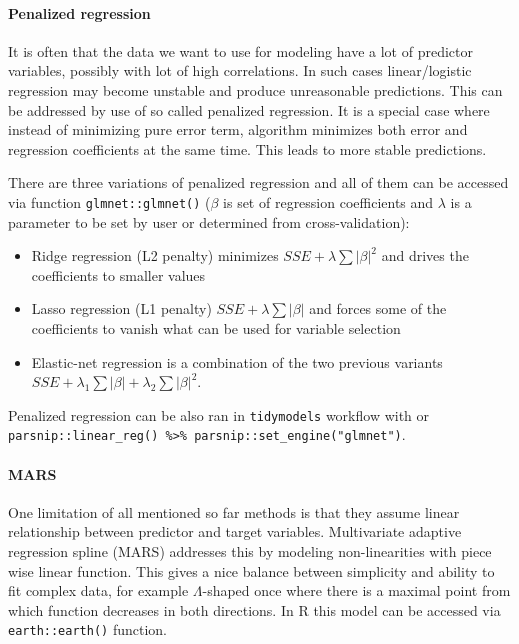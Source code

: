 \documentclass[
]{book}
\providecommand{\tightlist}{%
  \setlength{\itemsep}{0pt}\setlength{\parskip}{0pt}}
\begin{document}
\hypertarget{penalized-regression}{%
\paragraph{Penalized regression}\label{penalized-regression}}

It is often that the data we want to use for modeling have a lot of predictor
variables, possibly with lot of high correlations. In such cases linear/logistic
regression may become unstable and produce unreasonable predictions. This can be
addressed by use of so called penalized regression. It is a special case where
instead of minimizing pure error term, algorithm minimizes both error and regression
coefficients at the same time. This leads to more stable predictions.

There are three variations of penalized regression and all of them can be accessed
via function \texttt{glmnet::glmnet()} (\(\beta\) is set of regression coefficients and
\(\lambda\) is a parameter to be set by user or determined from cross-validation):

\begin{itemize}
\tightlist
\item
  Ridge regression (L2 penalty) minimizes \(SSE + \lambda \sum|\beta|^2\) and drives
  the coefficients to smaller values
\item
  Lasso regression (L1 penalty) \(SSE + \lambda \sum|\beta|\) and forces some of the
  coefficients to vanish what can be used for variable selection
\item
  Elastic-net regression is a combination of the two previous variants
  \(SSE + \lambda_1 \sum|\beta| + \lambda_2 \sum|\beta|^2\).
\end{itemize}

Penalized regression can be also ran in \texttt{tidymodels} workflow with
or \texttt{parsnip::linear\_reg()\ \%\textgreater{}\%\ parsnip::set\_engine("glmnet")}.

\hypertarget{mars}{%
\paragraph{MARS}\label{mars}}

One limitation of all mentioned so far methods is that they assume linear relationship
between predictor and target variables. Multivariate adaptive regression spline (MARS)
addresses this by modeling non-linearities with piece wise linear function. This
gives a nice balance between simplicity and ability to fit complex data, for example
\(\Lambda\)-shaped once where there is a maximal point from which function decreases
in both directions. In R this model can be accessed via \texttt{earth::earth()} function.
\end{document}
